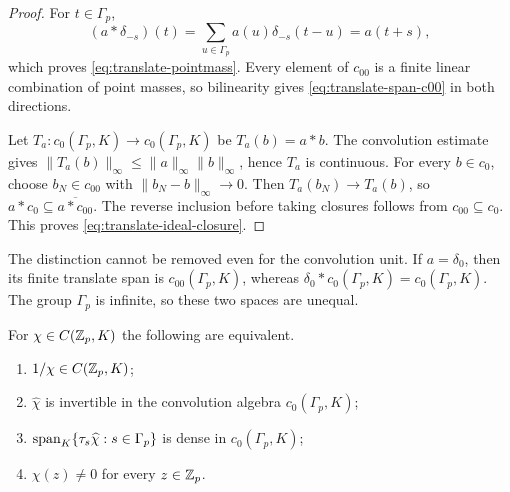 \begin{proof}
For $t\in\Gamma_p$,
\[
 (a*\delta_{-s})(t)
 =\sum_{u\in\Gamma_p}a(u)\delta_{-s}(t-u)
 =a(t+s),
\]
which proves \cref{eq:translate-pointmass}.  Every element of $c_{00}$ is a
finite linear combination of point masses, so bilinearity gives
\cref{eq:translate-span-c00} in both directions.

Let $T_a:c_0(\Gamma_p,K)\to c_0(\Gamma_p,K)$ be $T_a(b)=a*b$.
The convolution estimate gives
$\|T_a(b)\|_\infty\leq\|a\|_\infty\|b\|_\infty$, hence $T_a$ is continuous.
For every $b\in c_0$, choose $b_N\in c_{00}$ with
$\|b_N-b\|_\infty\to0$.  Then $T_a(b_N)\to T_a(b)$, so
$a*c_0\subseteq\overline{a*c_{00}}$.  The reverse inclusion before taking
closures follows from $c_{00}\subseteq c_0$.  This proves
\cref{eq:translate-ideal-closure}.
\end{proof}

\begin{remark}
The distinction cannot be removed even for the convolution unit.  If
$a=\delta_0$, then its finite translate span is
$c_{00}(\Gamma_p,K)$, whereas
$\delta_0*c_0(\Gamma_p,K)=c_0(\Gamma_p,K)$.  The group $\Gamma_p$ is
infinite, so these two spaces are unequal.
\end{remark}

\begin{theorem}
\label{thm:pq-WTT-function}
For $\chi\in C(\mathbb Z_p,K)$ the following are equivalent.
\begin{enumerate}[label=\textup{(\roman*)}]
\item $1/\chi\in C(\mathbb Z_p,K)$;
\item $\widehat\chi$ is invertible in the convolution algebra
      $c_0(\Gamma_p,K)$;
\item $\operatorname{span}_K\{\tau_s\widehat\chi:s\in\Gamma_p\}$ is dense in
      $c_0(\Gamma_p,K)$;
\item $\chi(z)\ne0$ for every $z\in\mathbb Z_p$.
\end{enumerate}
\end{theorem}

